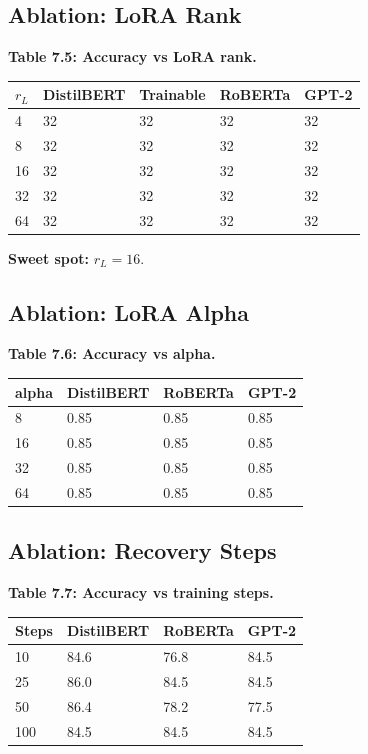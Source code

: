 \subsection{Ablation: LoRA Rank}

\textbf{Table 7.5: Accuracy vs LoRA rank.}

\begin{table}[H]
\centering
\small
\begin{tabular}{lllll}
\toprule
\textbf{$r_L$} & \textbf{DistilBERT} & \textbf{Trainable} & \textbf{RoBERTa} & \textbf{GPT-2} \\
\midrule
4 & 32 & 32 & 32 & 32 \\
8 & 32 & 32 & 32 & 32 \\
16 & 32 & 32 & 32 & 32 \\
32 & 32 & 32 & 32 & 32 \\
64 & 32 & 32 & 32 & 32 \\
\bottomrule
\end{tabular}
\end{table}

\textbf{Sweet spot:} $r_L = 16$.

\subsection{Ablation: LoRA Alpha}

\textbf{Table 7.6: Accuracy vs alpha.}

\begin{table}[H]
\centering
\small
\begin{tabular}{llll}
\toprule
\textbf{alpha} & \textbf{DistilBERT} & \textbf{RoBERTa} & \textbf{GPT-2} \\
\midrule
8 & 0.85 & 0.85 & 0.85 \\
16 & 0.85 & 0.85 & 0.85 \\
32 & 0.85 & 0.85 & 0.85 \\
64 & 0.85 & 0.85 & 0.85 \\
\bottomrule
\end{tabular}
\end{table}

\subsection{Ablation: Recovery Steps}

\textbf{Table 7.7: Accuracy vs training steps.}

\begin{table}[H]
\centering
\small
\begin{tabular}{llll}
\toprule
\textbf{Steps} & \textbf{DistilBERT} & \textbf{RoBERTa} & \textbf{GPT-2} \\
\midrule
10 & 84.6 & 76.8 & 84.5 \\
25 & 86.0 & 84.5 & 84.5 \\
50 & 86.4 & 78.2 & 77.5 \\
100 & 84.5 & 84.5 & 84.5 \\
\bottomrule
\end{tabular}
\end{table}

